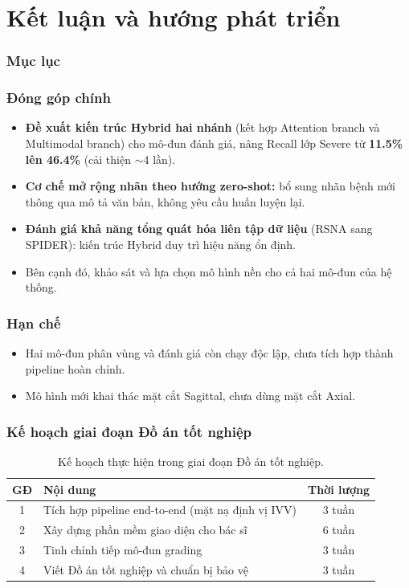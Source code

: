 \documentclass{beamer}
\numberwithin{figure}{section}
\numberwithin{table}{section}
\begin{document}
\section{Kết luận và hướng phát triển}
{
    \begin{frame}
        \frametitle{Mục lục}
    \end{frame}
}

\begin{frame}
\frametitle{Đóng góp chính}
\begin{itemize}
    \item[1.] \textbf{Đề xuất kiến trúc Hybrid hai nhánh} (kết hợp Attention branch và Multimodal branch) cho mô-đun đánh giá, nâng Recall lớp Severe từ \textbf{11.5\% lên 46.4\%} (cải thiện $\sim$4 lần).
    \item[2.] \textbf{Cơ chế mở rộng nhãn theo hướng zero-shot:} bổ sung nhãn bệnh mới thông qua mô tả văn bản, không yêu cầu huấn luyện lại.
    \item[3.] \textbf{Đánh giá khả năng tổng quát hóa liên tập dữ liệu} (RSNA sang SPIDER): kiến trúc Hybrid duy trì hiệu năng ổn định.
    \item[--] Bên cạnh đó, khảo sát và lựa chọn mô hình nền cho cả hai mô-đun của hệ thống.
\end{itemize}
\end{frame}

\begin{frame}
\frametitle{Hạn chế}
\begin{itemize}
    \item[--] Hai mô-đun phân vùng và đánh giá còn chạy độc lập, chưa tích hợp thành pipeline hoàn chỉnh.
    \item[--] Mô hình mới khai thác mặt cắt Sagittal, chưa dùng mặt cắt Axial.
\end{itemize}
\end{frame}

\begin{frame}
\frametitle{Kế hoạch giai đoạn Đồ án tốt nghiệp}
\begin{table}
\centering
\begin{tabular}{clc}
\toprule
\textbf{GĐ} & \textbf{Nội dung} & \textbf{Thời lượng} \\
\midrule
1 & Tích hợp pipeline end-to-end (mặt nạ định vị IVV) & 3 tuần \\
2 & Xây dựng phần mềm giao diện cho bác sĩ & 6 tuần \\
3 & Tinh chỉnh tiếp mô-đun grading & 3 tuần \\
4 & Viết Đồ án tốt nghiệp và chuẩn bị bảo vệ & 3 tuần \\
\bottomrule
\end{tabular}
\caption{Kế hoạch thực hiện trong giai đoạn Đồ án tốt nghiệp.}
\end{table}
\end{frame}
\end{document}
